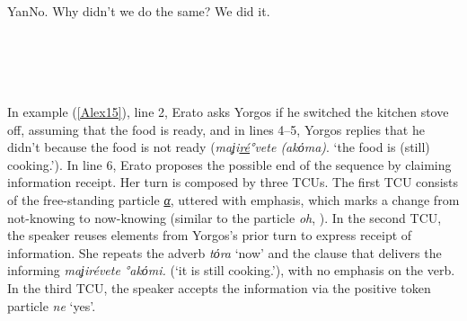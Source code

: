 \documentclass[output=paper]{LSP/langsci}
\begin{document}
\begin{Transcript}[FS {>}{>\hspace{0.2in}}]{Yan}{No. Why didn’t we do the same? We did it.}
\label{Alex14}
\\
\\
\\
\\ 
 \\
\end{Transcript}


In example (\ref{Alex15}), line 2, Erato asks Yorgos if he switched the kitchen stove off, assuming that the food is ready, and in lines 4--5, Yorgos replies that he didn’t because the food is not ready (\textit{maʝi\underline{ré}°vete (akόma)}. `the food is (still) cooking.'). In line 6, Erato proposes the possible end of the sequence by claiming information receipt. Her turn is composed by three TCUs. The first TCU consists of the free-standing particle \textit{\underline{α}}, uttered with emphasis, which marks a change from not-knowing to now-knowing (similar to the  particle \textit{oh}, \citealt{heritage1984}). In the second TCU, the speaker reuses elements from Yorgos’s prior turn to express receipt of information. She repeats the adverb \textit{tόra} `now' and the clause that delivers the informing \textit{maʝirévete °akόmi.} (`it is still cooking.'), with no emphasis on the verb. In the third TCU, the speaker accepts the information via the positive token particle \textit{ne} `yes'. 
\end{document}
